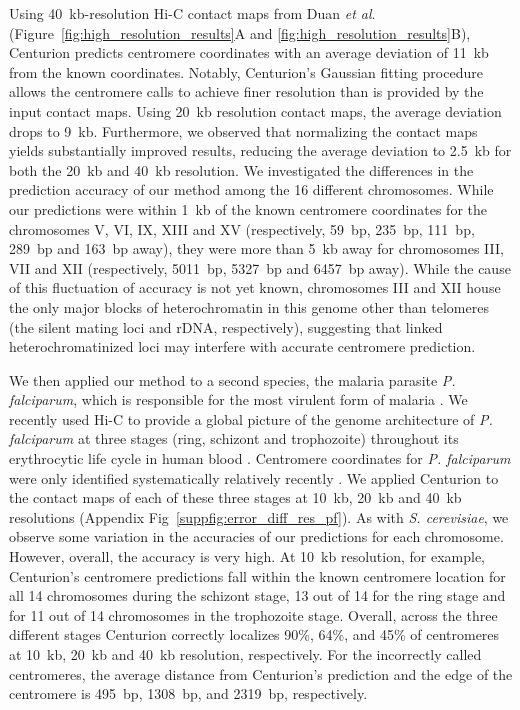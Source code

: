 Using 40~kb-resolution Hi-C contact maps from Duan
\textit{et al}.~\cite{duan:genome-wide}
(Figure~\ref{fig:high_resolution_results}A and
\ref{fig:high_resolution_results}B), Centurion predicts centromere
coordinates with an average deviation of 11~kb from the known coordinates.
Notably, Centurion's Gaussian fitting procedure allows the centromere calls to
achieve finer resolution than is provided by the input contact maps. Using
20~kb resolution contact maps, the average deviation drops to 9~kb.
Furthermore, we observed that normalizing the contact maps
\citep{imakaev:iterative} yields substantially improved results, reducing the
average deviation to 2.5~kb for both the 20~kb and 40~kb resolution. We
investigated the differences in the prediction accuracy of our method among
the 16 different chromosomes. While our predictions were within 1~kb of the
known centromere coordinates for the chromosomes V, VI, IX, XIII and XV
(respectively, 59~bp, 235~bp, 111~bp, 289~bp and 163~bp away), they were more
than 5~kb away for chromosomes III, VII and XII (respectively, 5011~bp, 5327~bp
and 6457~bp away).
While the cause of this fluctuation of accuracy is not yet known,
chromosomes III and XII house the only major blocks of heterochromatin
in this genome other than telomeres
 (the silent mating loci and rDNA,
respectively), suggesting that linked heterochromatinized loci may interfere
with accurate centromere prediction.

We then applied our method to a second species, the malaria parasite
\textit{P. falciparum}, which is responsible for the most virulent
form of malaria \citep{who:malaria}. We recently used Hi-C to provide a global
picture of the genome architecture of \textit{P. falciparum} at three stages
(ring, schizont and trophozoite) throughout its erythrocytic life cycle in
human blood \citep{ay:three-dimensional}. Centromere coordinates for
\textit{P. falciparum} were only identified systematically relatively recently
\citep{hoeijmakers:plasmodium}. We applied Centurion to the contact maps of
each of these three stages at 10~kb, 20~kb and 40~kb resolutions
(Appendix Fig~\ref{suppfig:error_diff_res_pf}).
As with \textit{S. cerevisiae}, we observe some
variation in the accuracies of our predictions for each chromosome. However,
overall, the accuracy is very high. At 10~kb resolution, for example,
Centurion's centromere predictions fall within the known centromere location
for all 14 chromosomes during the schizont stage, 13 out of 14 for the ring stage and for
11 out of 14 chromosomes in the trophozoite stage. Overall, across the three
different stages Centurion correctly localizes 90\%, 64\%, and 45\% of
centromeres at 10~kb, 20~kb and 40~kb resolution, respectively. For the
incorrectly called centromeres, the average distance from Centurion's
prediction and the edge of the centromere is 495~bp, 1308~bp, and 2319~bp,
respectively.


